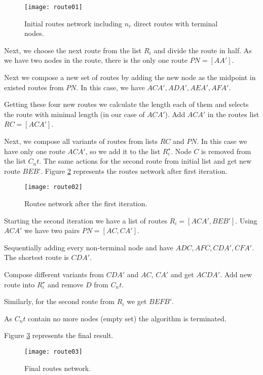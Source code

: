 \begin{figure}[ht!]
    \centering
    \texttt{[image: route01]}
    \caption{Initial routes network including \( n_r \) direct routes with terminal nodes.}
    \label{fig:route_first}
\end{figure}

Next, we choose the next route from the list \( R_i \) and divide the route in half. As we have two nodes 
in the route, there is the only one route \( PN = [AA'] \).

Next we compose a new set of routes by adding the new node as the midpoint in existed routes from \( PN \). 
In this case, we have \( ACA', ADA', AEA', AFA' \). 

Getting these four new routes we calculate the length each of them and selects the route with minimal 
length (in our case of \( ACA' \)). Add \( ACA' \) in the routes list \( RC = [ACA'] \).

Next, we compose all variants of routes from lists \( RC \) and \( PN \). In this case we have only one 
route \( ACA' \), so we add it to the list \( R^{\star}_{i} \). Node \( C \) is removed from the list 
\( C_nt \). The same actions for the second route from initial list and get new route \( BEB’ \). 
Figure \ref{fig:route_second} represents the routes network after first iteration. 

\begin{figure}[ht!]
    \centering
    \texttt{[image: route02]}
    \caption{Routes network after the first iteration.}
    \label{fig:route_second}
\end{figure}

Starting the second iteration we have a list of routes \( R_i = [ACA', BEB'] \). Using \( ACA' \) we have 
two pairs \( PN=[AC, CA'] \). 

Sequentially adding every non-terminal node and have \( ADC, AFC, CDA', CFA' \). The shortest route is 
\( CDA' \). 

Compose different variants from \( CDA' \) and \( AC \), \( CA' \) and get \( ACDA' \). Add new route 
into \( R^{\star}_i \) and remove \( D \) from \( C_nt \).

Similarly, for the second route from \( R_i \) we get \( BEFB' \).

As \( C_nt \) contain no more nodes (empty set) the algorithm is terminated. 

Figure \ref{fig:route_third} represents the final result.

\begin{figure}[ht!]
    \centering
    \texttt{[image: route03]}
    \caption{Final routes network.}
    \label{fig:route_third}
\end{figure}

